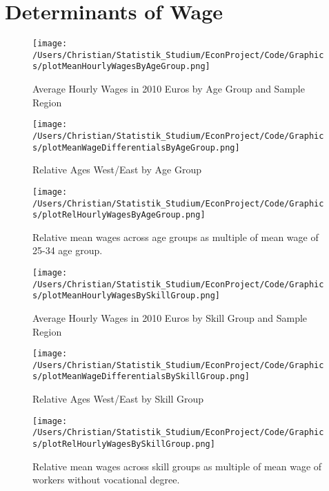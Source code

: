 \documentclass{article}
\begin{document}
\section{Determinants of Wage}



\begin{figure}[!h]
    \centering
    \texttt{[image: /Users/Christian/Statistik\_Studium/EconProject/Code/Graphics/plotMeanHourlyWagesByAgeGroup.png]}
    \caption{Average Hourly Wages in 2010 Euros by Age Group and Sample Region}
    \label{fig:MeanHourlyWagesByAgeGroup}
\end{figure}

\begin{figure}[!h]
    \centering
    \texttt{[image: /Users/Christian/Statistik\_Studium/EconProject/Code/Graphics/plotMeanWageDifferentialsByAgeGroup.png]}
    \caption{Relative Ages West/East by Age Group}
    \label{fig:MeanWageDifferentialsByAgeGroup}
\end{figure}

\begin{figure}[!h]
    \centering
    \texttt{[image: /Users/Christian/Statistik\_Studium/EconProject/Code/Graphics/plotRelHourlyWagesByAgeGroup.png]}
    \caption{Relative mean wages across age groups as multiple of mean wage of 25-34 age group.}
    \label{fig:RelHourlyWagesByAgeGroup}
\end{figure}

\begin{figure}[!h]
    \centering
    \texttt{[image: /Users/Christian/Statistik\_Studium/EconProject/Code/Graphics/plotMeanHourlyWagesBySkillGroup.png]}
    \caption{Average Hourly Wages in 2010 Euros by Skill Group and Sample Region}
    \label{fig:MeanHourlyWagesBySkillGroup}
\end{figure}

\begin{figure}[!h]
    \centering
    \texttt{[image: /Users/Christian/Statistik\_Studium/EconProject/Code/Graphics/plotMeanWageDifferentialsBySkillGroup.png]}
    \caption{Relative Ages West/East by Skill Group}
    \label{fig:MeanWageDifferentialsBySkillGroup}
\end{figure}

\begin{figure}[!h]
    \centering
    \texttt{[image: /Users/Christian/Statistik\_Studium/EconProject/Code/Graphics/plotRelHourlyWagesBySkillGroup.png]}
    \caption{Relative mean wages across skill groups as multiple of mean wage of workers without vocational degree.}
    \label{fig:RelHourlyWagesBySkillGroup}
\end{figure}
\end{document}
